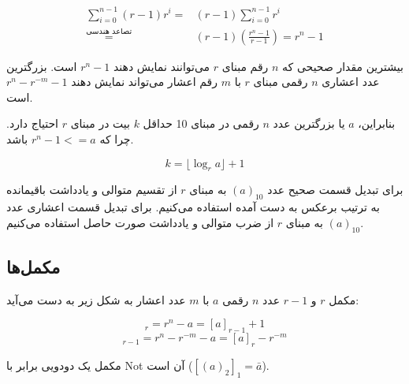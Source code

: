 \documentclass[a5paper]{article}
\begin{document}
\begin{equation}\begin{split}
  \sum_{i=0}^{n-1}(r-1)r^{i} = &(r-1)\sum_{i=0}^{n-1}r^{i}\\
  \overset{\text{تصاعد هندسی}}{=} &(r-1)(\frac{r^{n}-1}{r-1}) = r^{n} -1
\end{split}\end{equation}

بیشترین مقدار صحیحی که $n$ رقم مبنای $r$ می‌توانند نمایش دهند $r^{n} - 1$ است.
بزرگترین عدد اعشاری $n$ رقمی مبنای $r$ با $m$ رقم اعشار می‌تواند نمایش دهند $r^{n} - r^{-m} - 1$ است.

بنابراین، $a$ یا بزرگترین عدد $n$ رقمی در مبنای 10 حداقل $k$ بیت در مبنای $r$ احتیاج دارد. چرا که $r^{n}-1 <= a$ باشد.

\begin{equation}
  k = \lfloor \log_{r}a \rfloor + 1
\end{equation}

برای تبدیل قسمت صحیح عدد $(a)_{10}$ به مبنای $r$ از تقسیم متوالی و یادداشت باقیمانده به ترتیب برعکس به دست آمده استفاده می‌کنیم.
برای تبدیل قسمت اعشاری عدد $(a)_{10}$ به مبنای $r$ از ضرب متوالی و یادداشت صورت حاصل استفاده می‌کنیم.

\subsection{مکمل‌ها}
مکمل $r$ و $r-1$ عدد $n$ رقمی $a$ با $m$ عدد اعشار به شکل زیر به دست می‌آید:

\begin{equation}
  [a]_{r} = r^{n} - a = [a]_{r-1} + 1 \label{eq:radix}
\end{equation}
\begin{equation}
  [a]_{r-1} = r^{n} - r^{-m} - a = [a]_{r} - r^{-m}
\end{equation}

مکمل یک دودویی برابر با Not آن است ($[(a)_{2}]_{1} = \bar{a}$).
\end{document}
